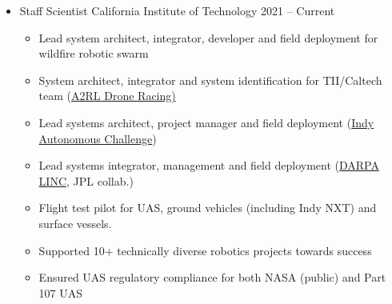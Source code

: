 \documentclass[12pt,letter,sans]{moderncv}
\begin{document}
\begin{itemize}

\item{\cventry
    {}
    {Staff Scientist}
    {California Institute of Technology}
    {2021 -- Current}
	{}
	{ 
        \vspace{3pt} 
        \begin{itemize}
            \item Lead system architect, integrator, developer and field deployment for wildfire robotic swarm
            \item System architect, integrator and system identification for TII/Caltech team (\href{https://a2rl.io/autonomous-drone-race}{A2RL Drone Racing)}
			\item Lead systems architect, project manager and field deployment (\href{https://www.indyautonomouschallenge.com/california-institute-of-technology-joins-the-indy-autonomous-challenge}{Indy Autonomous Challenge})            
            \item Lead systems integrator, management and field deployment (\href{https://www.darpa.mil/news-events/2024-3-7}{DARPA LINC}, JPL collab.)
            \item Flight test pilot for UAS, ground vehicles (including Indy NXT) and surface vessels.
            \item Supported 10+ technically diverse robotics projects towards success
            \item Ensured UAS regulatory compliance for both NASA (public) and Part 107 UAS
        \end{itemize}
    }
}

\vspace{4pt}


\end{itemize}
\end{document}
